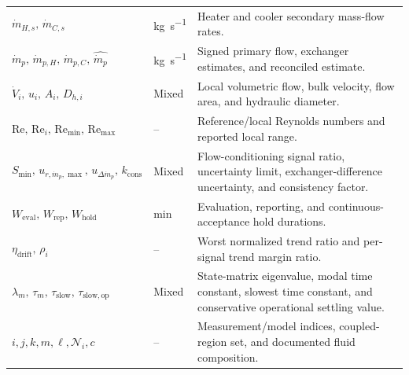 \documentclass[11pt]{article}
\newcommand{\mdotp}{\dot m_{p}}
\newcommand{\mdotpH}{\dot m_{p,H}}
\newcommand{\mdotpC}{\dot m_{p,C}}
\newcommand{\Rey}{\mathrm{Re}}
\begin{document}
\begin{longtable}{@{}>{\raggedright\arraybackslash}p{1.78in}>{\raggedright\arraybackslash}p{1.08in}>{\raggedright\arraybackslash}p{3.62in}@{}}
$\dot m_{H,s},\,\dot m_{C,s}$ & \si{\kilogram\per\second} & Heater and cooler secondary mass-flow rates. \\
$\mdotp,\,\mdotpH,\,\mdotpC,\,\hat{\mdotp}$ & \si{\kilogram\per\second} & Signed primary flow, exchanger estimates, and reconciled estimate. \\
$\dot V_i,\,u_i,\,A_i,\,D_{h,i}$ & Mixed & Local volumetric flow, bulk velocity, flow area, and hydraulic diameter. \\
$\Rey,\,\Rey_i,\,\Rey_{\min},\,\Rey_{\max}$ & -- & Reference/local Reynolds numbers and reported local range. \\
$S_{\min},\,u_{r,\mdotp,\max},\,u_{\Delta\mdotp},\,k_{\mathrm{cons}}$ & Mixed & Flow-conditioning signal ratio, uncertainty limit, exchanger-difference uncertainty, and consistency factor. \\
$W_{\mathrm{eval}},\,W_{\mathrm{rep}},\,W_{\mathrm{hold}}$ & \si{\minute} & Evaluation, reporting, and continuous-acceptance hold durations. \\
$\eta_{\mathrm{drift}},\,\rho_i$ & -- & Worst normalized trend ratio and per-signal trend margin ratio. \\
$\lambda_m,\,\tau_m,\,\tau_{\mathrm{slow}},\,\tau_{\mathrm{slow,op}}$ & Mixed & State-matrix eigenvalue, modal time constant, slowest time constant, and conservative operational settling value. \\
$i,j,k,m,\ell,\mathcal N_i,c$ & -- & Measurement/model indices, coupled-region set, and documented fluid composition. \\
\end{longtable}
\endgroup
\end{document}

